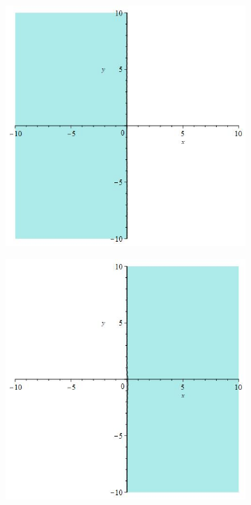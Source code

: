 \documentclass[12pt]{article}
\begin{document}
\begin{figure}[H]
    \centering
    \begin{subfigure}{0.24\textwidth}
        \includegraphics[width=0.9\linewidth]{stabrks2_2i.jpg}
    \end{subfigure}
    \begin{subfigure}{0.24\textwidth}
        \includegraphics[width=0.9\linewidth]{stabrks2_3i.jpg}

\end{subfigure}
\end{figure}
\end{document}
